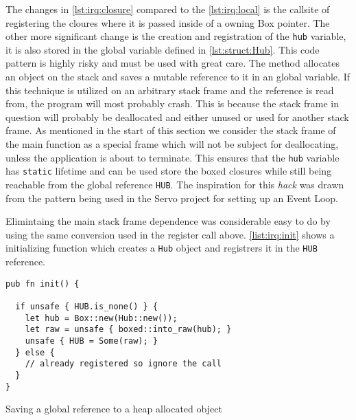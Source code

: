 The changes in \autoref{lst:irq:closure} compared to the \autoref{lst:irq:local} is the callsite of registering the cloures where it is passed inside of a owning Box pointer. 
The other more significant change is the creation and registration of the \texttt{hub} variable, it is also stored in the global variable defined in \autoref{lst:struct:Hub}.
This code pattern is highly risky and must be used with great care.
The method allocates an object on the stack and saves a mutable reference to it in an global variable.
If this technique is utilized on an arbitrary stack frame and the reference is read from, the program will most probably crash.
This is because the stack frame in question will probably be deallocated and either unused or used for another stack frame.
As mentioned in the start of this section we consider the stack frame of the main function as a special frame which will not be subject for deallocating, unless the application is about to terminate.
This ensures that the \texttt{hub} variable has \texttt{static} lifetime and can be used store the boxed closures while still being reachable from the global reference \texttt{HUB}.
The inspiration for this \textit{hack} was drawn from the pattern being used in the Servo project for setting up an Event Loop.

Elimintaing the main stack frame dependence was considerable easy to do by using the same conversion used in the register call above.
\autoref{list:irq:init} shows a initializing function which creates a \texttt{Hub} object and registrers it in the \texttt{HUB} reference.

\begin{listing}[H]
  \begin{verbatim}
pub fn init() {

  if unsafe { HUB.is_none() } {
    let hub = Box::new(Hub::new());
    let raw = unsafe { boxed::into_raw(hub); }
    unsafe { HUB = Some(raw); }
  } else {
    // already registered so ignore the call
  }
}
  \end{verbatim}
  \caption{Saving a global reference to a heap allocated object}
  \label{lst:irq:closure}
\end{listing}
